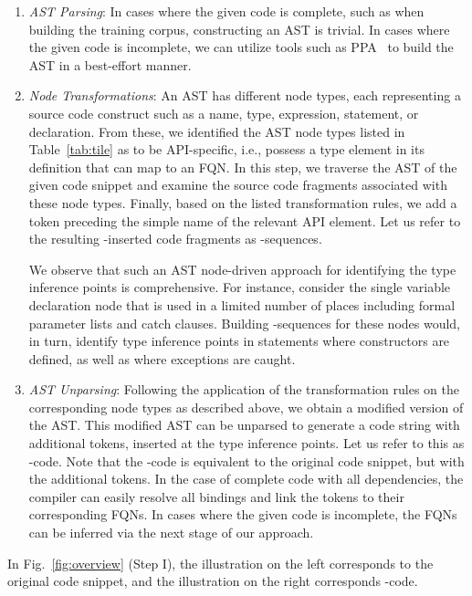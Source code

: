 \begin{enumerate}
    \item \textit{AST Parsing}: In cases where the given code is complete, such as when building the training corpus, constructing an AST is trivial. In cases where the given code is incomplete, we can utilize tools such as PPA~\cite{dagenais-oopsla08} to build the AST in a best-effort manner. 

    \item \textit{Node Transformations}: An AST has different node types, each representing a source code construct such as a name, type, expression, statement, or declaration. From these, we identified the AST node types listed in Table~\ref{tab:tile} as to be API-specific, i.e., possess a type element in its definition that can map to an FQN. In this step, we traverse the AST of the given code snippet and examine the source code fragments associated with these node types. Finally, based on the listed transformation rules, we add a  token preceding the simple name of the relevant API element. Let us refer to the resulting -inserted code fragments as -sequences.

    We observe that such an AST node-driven approach for identifying the type inference points is comprehensive. For instance, consider the single variable declaration node that is used in a limited number of places including formal parameter lists and catch clauses. Building -sequences for these nodes would, in turn, identify type inference points in statements where constructors are defined, as well as where exceptions are caught.

    \item \textit{AST Unparsing}: Following the application of the transformation rules on the corresponding node types as described above, we obtain a modified version of the AST. This modified AST can be unparsed to generate a code string with additional  tokens, inserted at the type inference points. Let us refer to this as -code.
    Note that the -code is equivalent to the original code snippet, but with the additional  tokens.
    In the case of complete code with all dependencies, the compiler can easily resolve all bindings and link the  tokens to their corresponding FQNs. In cases where the given code is incomplete, the FQNs can be inferred via the next stage of our approach.
\end{enumerate}  

In Fig.~\ref{fig:overview} (Step I), the illustration on the left corresponds to the original code snippet, and the illustration on the right corresponds -code.


